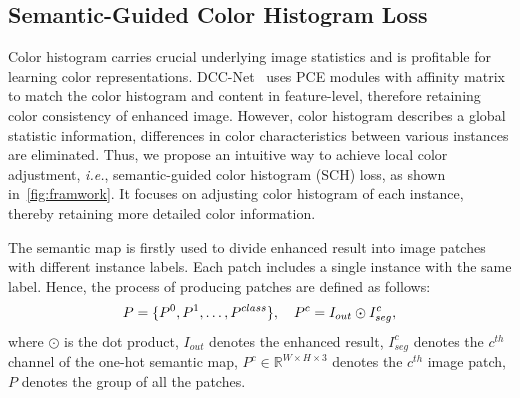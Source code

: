 \documentclass[10pt,twocolumn,letterpaper]{article}
\begin{document}
\subsection{Semantic-Guided Color Histogram Loss}
\label{subsec:scloss}

Color histogram carries crucial underlying image statistics and is profitable for learning color representations. DCC-Net~\cite{zhang2022colordccnet} uses PCE modules with affinity matrix to match the color histogram and content in feature-level, therefore retaining color consistency of enhanced image. However, color histogram describes a global statistic information, differences in color characteristics between various instances are eliminated. Thus, we propose an intuitive way to achieve local color adjustment, \textit{i.e.}, semantic-guided color histogram (SCH) loss, as shown in~\cref{fig:framwork}. It focuses on adjusting color histogram of each instance, thereby retaining more detailed color information. 

The semantic map is firstly used to divide enhanced result into image patches with different instance labels. Each patch includes a single instance with the same label. Hence, the process of producing patches are defined as follows:
\vspace{-0.1cm}
\begin{equation}
  P = \{P^{0}, P^{1}, \dotsc, P^{class}\}, \quad P^{c} = I_{out} \odot I_{seg}^{c},
  \label{eq:scloss1}
  \vspace{-0.1cm}
\end{equation}
where $\odot$ is the dot product, $I_{out}$ denotes the enhanced result, $I_{seg}^{c}$ denotes the $c^{th}$ channel of the one-hot semantic map, $P^c\in\mathbb{R}^{W\times H\times 3}$ denotes the $c^{th}$ image patch, $P$ denotes the group of all the patches. 
\end{document}
